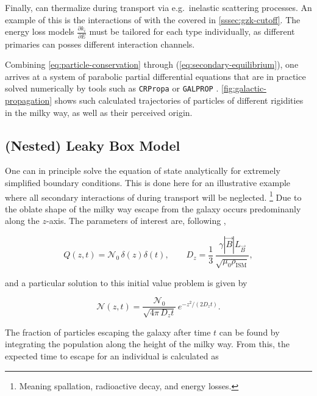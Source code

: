 Finally, \CRs can thermalize during transport via e.g.\ inelastic scattering
processes. An example of this is the interactions of \UHECRs with the \CMB 
covered in \cref{sssec:gzk-cutoff}. The energy loss models
$\frac{\partial k_i}{\partial E} $ must be tailored for each \CR type 
individually, as different primaries can posses different interaction channels.

Combining \cref{eq:particle-conservation} through 
(\ref{eq:secondary-equilibrium}), one arrives at a system of parabolic partial 
differential equations that are in practice solved numerically by tools such as
\texttt{CRPropa} \cite{batistaCRPropa32Advanced2022} or \texttt{GALPROP}
\cite{strongGALPROPCosmicRayPropagation2009}. \cref{fig:galactic-propagation} 
shows such calculated trajectories of particles of different rigidities in the 
milky way, as well as their perceived origin.

\halflift
\subsection{(Nested) Leaky Box Model}
\label{ssec:leaky-box-model}

One can in principle solve the equation of state analytically for extremely
simplified boundary conditions. This is done here for an illustrative example 
where all secondary interactions of \CRs during transport will be neglected.
\footnote{Meaning spallation, radioactive decay, and energy losses.} Due to the
oblate shape of the milky way escape from the galaxy occurs predominanly along
the $z$-axis. The parameters of interest are, following 
\cite{skillingDiffusionCosmicRays1970},

\begin{equation}
	Q(z, t) = \mathcal{N}_0 \, \delta(z)\delta(t), \qquad D_z = \frac{1}{3} \,\frac{\gamma|\vec{B}|L_{\vec{B}}}{\sqrt{\mu_0\rho_\mathrm{ISM}}},
\end{equation}

and a particular solution to this initial value problem is given by

\begin{equation}
	\mathcal{N}(z, t) = \frac{\mathcal{N}_0}{\sqrt{4\pi\,D_z t}} \, e^{-z^2/(2D_z t)}.
\end{equation}

The fraction of particles escaping the galaxy after time $t$ can be found by
integrating the \CR population along the height of the milky way. From this,
the expected time to escape for an individual \CR is calculated as

